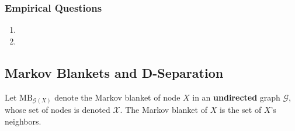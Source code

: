 \documentclass[12pt]{article}
\begin{document}
\subsubsection{Empirical Questions}

\begin{enumerate}
	\item 

	\item 
\end{enumerate}

\subsection{Markov Blankets and D-Separation}
Let $\text{MB}_{\mathcal{G}(X)}$ denote the Markov blanket of node $X$ in an \textbf{undirected} graph $\mathcal{G}$, whose set of nodes is denoted $\mathcal{X}$. The Markov blanket of $X$ is the set of $X$'s neighbors. 
\end{document}
